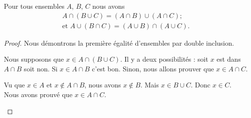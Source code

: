 \begin{lemma}		\label{LEMooHPUNooPmViwi}
	Pour tous ensembles \( A\), \( B\), \( C\) nous avons
	\begin{gather}
		A\cap(B\cup C)=(A\cap B)\cup (A\cap C);\\ \text{et }
		A\cup(B\cap C)=(A\cup B)\cap (A\cup C).
	\end{gather}
\end{lemma}

\begin{proof}
	Nous démontrons la première égalité d'ensembles par double inclusion.
	\begin{subproof}
		Nous supposons que \( x\in A\cap(B\cup C)\). Il y a deux possibilités : soit \( x\) est dans \( A\cap B\) soit non. Si \( x\in A\cap B\) c'est bon. Sinon, nous allons prouver que \( x\in A\cap C\).

		Vu que \( x\in A\) et \( x\not\in A\cap B\), nous avons \( x\not\in B\). Mais \( x\in B\cup C\). Donc \( x\in C\). Nous avons prouvé que \( x\in A\cap C\).


\end{subproof}
\end{proof}
